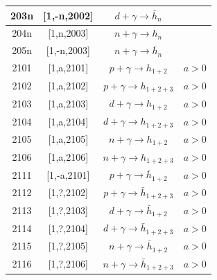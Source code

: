 \documentclass[prd,nofootinbib,eqsecnum,final]{revtex4}
\renewcommand{\(}{\left(}
\renewcommand{\)}{\right)}
\renewcommand{\[}{\left[}
\renewcommand{\]}{\right]}
\begin{document}
\begin{center}
\begin{longtable}{||c|c||c|p{8cm}||}
\\\hline
203n & [1,-n,2002] & $d+\gamma\to \bar h_n$ & 
\\\hline
204n & [1,n,2003] & $n+\gamma\to h_n$ & 
\\\hline
205n & [1,-n,2003] & $n+\gamma\to \bar h_n$ & 
\\\hline
2101 & [1,a,2101] & $p+\gamma\to h_{1+2}$ &  $a>0$
\\\hline
2102 & [1,a,2102] & $p+\gamma\to h_{1+2+3}$ &  $a>0$
\\\hline
2103 & [1,a,2103] & $d+\gamma\to h_{1+2}$ &  $a>0$
\\\hline
2104 & [1,a,2104] & $d+\gamma\to h_{1+2+3}$ &  $a>0$
\\\hline
2105 & [1,a,2105] & $n+\gamma\to h_{1+2}$ &  $a>0$
\\\hline
2106 & [1,a,2106] & $n+\gamma\to h_{1+2+3}$ &  $a>0$
\\\hline
2111 & [1,-a,2101] & $p+\gamma\to \bar h_{1+2}$ &  $a>0$
\\\hline
2112 & [1,?,2102] & $p+\gamma\to \bar h_{1+2+3}$ &  $a>0$
\\\hline
2113 & [1,?,2103] & $d+\gamma\to \bar h_{1+2}$ &  $a>0$
\\\hline
2114 & [1,?,2104] & $d+\gamma\to \bar h_{1+2+3}$ &  $a>0$
\\\hline
2115 & [1,?,2105] & $n+\gamma\to \bar h_{1+2}$ &  $a>0$
\\\hline
2116 & [1,?,2106] & $n+\gamma\to \bar h_{1+2+3}$ &  $a>0$
\end{longtable}
\end{center}

\clearpage
\end{document}
